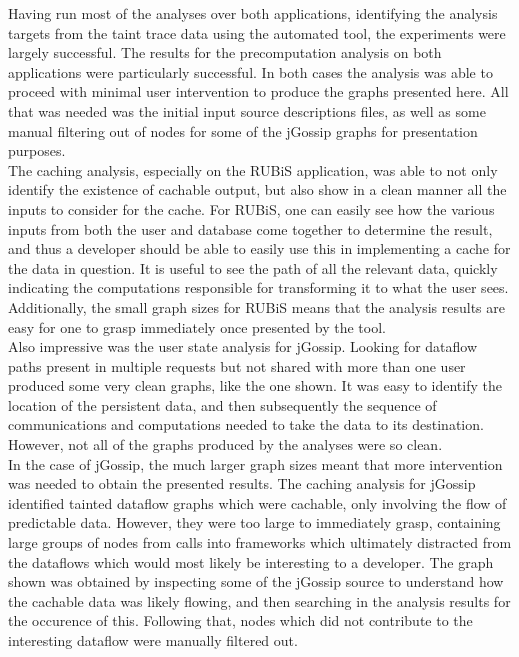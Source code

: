 \documentclass[msc,oneside]{ubcthesis}
\begin{document}
Having run most of the analyses over both applications, identifying the analysis targets from the taint trace data using the automated tool, the experiments were largely successful. The results for the precomputation analysis on both applications were particularly successful. In both cases the analysis was able to proceed with minimal user intervention to produce the graphs presented here. All that was needed was the initial input source descriptions files, as well as some manual filtering out of nodes for some of the jGossip graphs for presentation purposes.\\

The caching analysis, especially on the RUBiS application, was able to not only identify the existence of cachable output, but also show in a clean manner all the inputs to consider for the cache. For RUBiS, one can easily see how the various inputs from both the user and database come together to determine the result, and thus a developer should be able to easily use this in implementing a cache for the data in question. It is useful to see the path of all the relevant data, quickly indicating the computations responsible for transforming it to what the user sees. Additionally, the small graph sizes for RUBiS means that the analysis results are easy for one to grasp immediately once presented by the tool. \\

Also impressive was the user state analysis for jGossip. Looking for dataflow paths present in multiple requests but not shared with more than one user produced some very clean graphs, like the one shown. It was easy to identify the location of the persistent data, and then subsequently the sequence of communications and computations needed to take the data to its destination. However, not all of the graphs produced by the analyses were so clean.\\

In the case of jGossip, the much larger graph sizes meant that more intervention was needed to obtain the presented results. The caching analysis for jGossip identified tainted dataflow graphs which were cachable, only involving the flow of predictable data. However, they were too large to immediately grasp, containing large groups of nodes from calls into frameworks which ultimately distracted from the dataflows which would most likely be interesting to a developer. The graph shown was obtained by inspecting some of the jGossip source to understand how the cachable data was likely flowing, and then searching in the analysis results for the occurence of this. Following that, nodes which did not contribute to the interesting dataflow were manually filtered out.\\
\end{document}
